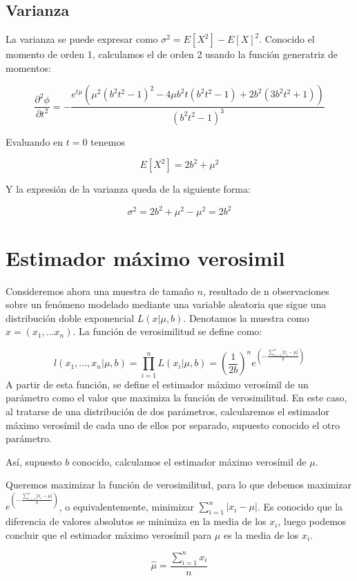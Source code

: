 \documentclass[a4paper, 10pt]{article} %
\newcounter{def}
\begin{document}
\subsection{Varianza}

La varianza se puede expresar como $\sigma^2 = E[X^2] - E[X]^2$. Conocido el momento de orden 1, calculamos el de orden 2 usando
la función generatriz de momentos:

$$\frac{\partial^2\phi}{\partial t^2} = -\frac{e^{t\mu}(\mu^2(b^2 t^2 -1)^2 -4\mu b^2 t(b^2 t^2 -1)+2b^2(3b^2 t^2+1))}{(b^2 t^2 -1)^3}$$

Evaluando en $t = 0$ tenemos

$$E[X^2]=2b^2 + \mu^2$$

Y la expresión de la varianza queda de la siguiente forma:

$$\sigma^2=2b^2 + \mu^2 - \mu^2=2b^2$$

\section{Estimador máximo verosimil}

Consideremos ahora una muestra de tamaño $n$, resultado de n observaciones sobre un fenómeno modelado mediante una variable aleatoria que sigue una distribución doble exponencial $L(x|\mu, b)$. Denotamos la muestra como $x = \left(x_1, \dots x_n\right)$. La función de verosimilitud se define como: 

$$l(x_1,...,x_n|\mu, b)=\prod_{i=1}^{n} L(x_i|\mu, b) = \left(\frac{1}{2b}\right)^n 
e^{\left(-\frac{\sum_{i=1}^{n}|x_i-\mu|}{b}\right)}
$$
A partir de esta función, se define el estimador máximo verosímil de un parámetro como el valor que maximiza la función de verosimilitud. En este caso, al tratarse de una distribución de dos parámetros, calcularemos el estimador máximo verosímil de cada uno de ellos por separado, supuesto conocido el otro parámetro. 

Así, supuesto $b$ conocido, calculamos el estimador máximo verosímil de $\mu$. 

Queremos maximizar la función de verosimilitud, para lo que debemos maximizar $e^{\left(-\frac{\sum_{i=1}^{n}|x_i-\mu|}{b}\right)}$, o equivalentemente, minimizar $\sum_{i=1}^{n}|x_i-\mu|$. Es conocido que la diferencia de valores absolutos se minimiza en la media de los $x_i$, luego podemos concluir que el estimador máximo verosímil para $\mu$ es la media de los $x_i$. 

$$\hat{\mu} = \frac{\sum_{i=1}^{n}x_i}{n}$$
\end{document}

